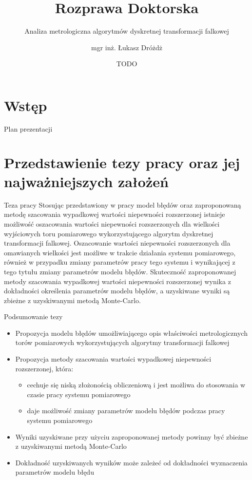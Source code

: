 \documentclass[12pt, polish]{beamer}
\date{TODO}
\title{Rozprawa Doktorska}
\author{mgr inż. Łukasz Dróżdż}
\subtitle{Analiza metrologiczna algorytmów dyskretnej transformacji falkowej}
\institute{Politechnika Śląska, Wydział Elektryczny \\ Katedra Metrologii, Elektroniki i Automatyki}
\begin{document}
\section*{Wstęp}

\begin{frame}
\titlepage
\end{frame}

\begin{frame}{Plan prezentacji}
\tableofcontents
\end{frame}

\section{Przedstawienie tezy pracy oraz jej najważniejszych założeń}

\begin{frame}{Teza pracy}
\justifying
Stosując przedstawiony w pracy model błędów oraz zaproponowaną metodę szacowania wypadkowej wartości niepewności rozszerzonej istnieje możliwość oszacowania wartości niepewności rozszerzonych dla wielkości wyjściowych toru pomiarowego wykorzystującego algorytm dyskretnej transformacji falkowej. Oszacowanie wartości niepewności rozszerzonych dla omawianych wielkości jest możliwe w trakcie działania systemu pomiarowego, również w przypadku zmiany parametrów pracy tego systemu i wynikającej z tego tytułu zmiany parametrów modelu błędów. Skuteczność zaproponowanej metody szacowania wypadkowej wartości niepewności rozszerzonej wynika z dokładności określenia parametrów modelu błędów, a uzyskiwane wyniki są zbieżne z uzyskiwanymi metodą Monte-Carlo.
\end{frame}

\begin{frame}{Podsumowanie tezy}
\begin{itemize}
\item Propozycja modelu błędów umożliwiającego opis właściwości metrologicznych torów pomiarowych wykorzystujących algorytmy transformacji falkowej
\item Propozycja metody szacowania wartości wypadkowej niepewności rozszerzonej, która:
	\begin{itemize}
	\item cechuje się niską złożonością obliczeniową i jest możliwa do stosowania w czasie pracy systemu pomiarowego
	\item daje możliwość zmiany parametrów modelu błędów podczas pracy systemu pomiarowego
	\end{itemize}
\item Wyniki uzyskiwane przy użyciu zaproponowanej metody powinny być zbieżne z uzyskiwanymi metodą Monte-Carlo
\item Dokładność uzyskiwanych wyników może zależeć od dokładności wyznaczenia parametrów modelu błędu
\end{itemize}
\end{frame}
\end{document}
